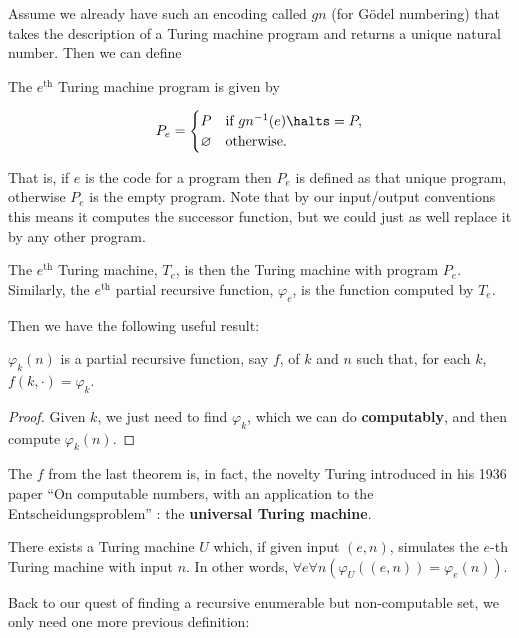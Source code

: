 \documentclass[../main.tex]{memoir}
\begin{document}
Assume we already have such an encoding called $gn$ (for Gödel numbering) that takes the description of a Turing machine program and returns a unique natural number. Then we can define

\begin{definition}
  The \textbf{$e^\text{th}$} Turing machine program is given by

  \[ P_e =
    \begin{cases}
      P & \text{if } gn^{-1}(e) \halts = P, \\
      \varnothing & \text{otherwise.}
    \end{cases}
  \]

  That is, if $e$ is the code for a program then $P_e$ is defined as that unique program, otherwise $P_e$ is the empty program. Note that by our input/output conventions this means it computes the successor function, but we could just as well replace it by any other program.

  The \textbf{$e^{\text{th}}$} Turing machine, $T_e$, is then the Turing machine with program $P_e$. Similarly, the \textbf{$e^{\text{th}}$} partial recursive function, $\varphi_e$, is the function computed by $T_e$.
\end{definition}

Then we have the following useful result:

\begin{theorem}
  $\varphi_k(n)$ is a partial recursive function, say $f$, of $k$ and $n$ such that, for each $k$, $f(k, \cdot) = \varphi_k$.
\end{theorem}
\begin{proof}
  Given $k$, we just need to find $\varphi_k$, which we can do \textbf{computably}, and then compute $\varphi_k(n)$.
\end{proof}

The $f$ from the last theorem is, in fact, the novelty Turing introduced in his 1936 paper ``On computable numbers, with an application to the Entscheidungsproblem'' \cite{oncomputablenumbers}: the \textbf{universal Turing machine}.

\begin{theorem}
  There exists a Turing machine $U$ which, if given input $(e, n)$, simulates the $e$-th Turing machine with input $n$. In other words, $\forall e \forall n (\varphi_U((e, n)) = \varphi_e(n))$.
\end{theorem}

Back to our quest of finding a recursive enumerable but non-computable set, we only need one more previous definition:
\end{document}
